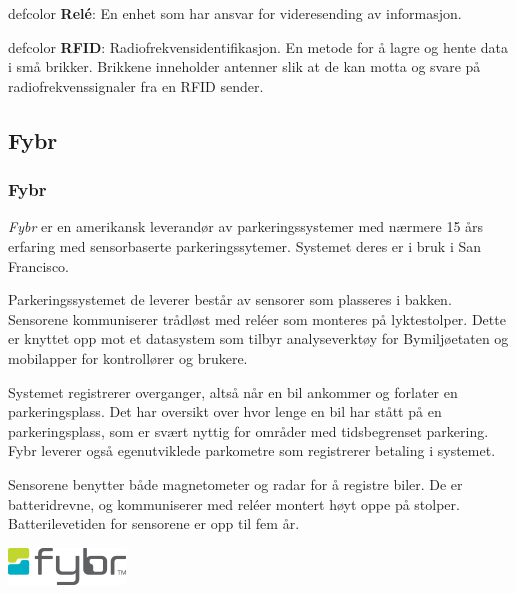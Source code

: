 \documentclass[xetex]{beamer}
\begin{document}
\begin{frame}
		\hfill\begin{beamercolorbox}[wd=0.35\textwidth, ht=5ex, dp=5pt, leftskip=.3cm, rightskip=.3cm]{defcolor}
    \tiny
    \textbf{Relé}: En enhet som har ansvar for videresending av informasjon.
	\end{beamercolorbox}\hfill
	\begin{beamercolorbox}[wd=0.60\textwidth, ht=10ex, dp=5pt, leftskip=.3cm, rightskip=.3cm]{defcolor}
    \tiny
    \textbf{RFID}: Radiofrekvensidentifikasjon. En metode for å lagre og hente data i små brikker. Brikkene inneholder antenner slik at de kan motta og svare på radiofrekvenssignaler fra en RFID sender.
	\end{beamercolorbox}
\end{frame}




\begin{frame}\label{fr:fybr}
	\subsection{Fybr}
	\frametitle{\alert{Fybr}}
	\emph{Fybr} er en amerikansk leverandør av parkeringssystemer med nærmere 15 års erfaring med \alert{sensorbaserte parkeringssytemer}. Systemet deres er i bruk i San Francisco.
	
	Parkeringssystemet de leverer består av \alert{sensorer} som plasseres i bakken. Sensorene kommuniserer trådløst med \alert{reléer} som monteres på lyktestolper. Dette er knyttet opp mot et datasystem som tilbyr \alert{analyseverktøy} for Bymiljøetaten og \alert{mobilapper} for kontrollører og brukere. 
	
	Systemet registrerer overganger, altså når en bil ankommer og forlater en parkeringsplass. Det har oversikt over hvor lenge en bil har stått på en parkeringsplass, som er svært nyttig for områder med \alert{tidsbegrenset parkering}. Fybr leverer også egenutviklede \alert{parkometre} som registrerer betaling i systemet.
	
	Sensorene benytter både \alert{magnetometer og radar} for å registre biler. De er batteridrevne, og kommuniserer med reléer montert høyt oppe på stolper. Batterilevetiden for sensorene er opp til \alert{fem år}.
	
	\vfill\hfill\includegraphics[scale=0.3]{grafikk/logoer/fybr.png}
\end{frame}
\end{document}
